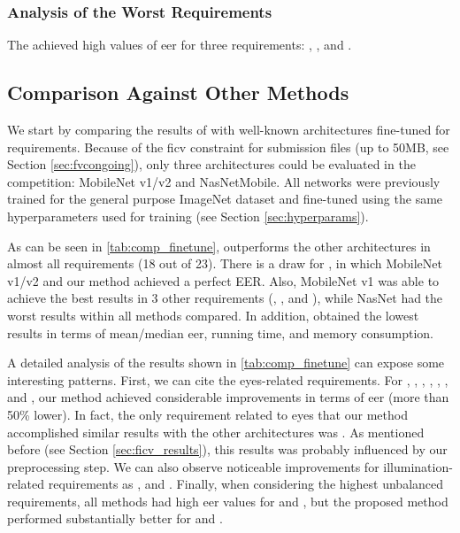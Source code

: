 

\subsubsection{Analysis of the Worst Requirements}

The \methodname achieved high values of \acs{eer} for three requirements: \inkmarked, \pixelation, and \otherfacesortoys. 


\subsection{Comparison Against Other Methods}

We start by comparing the results of \methodname with well-known architectures fine-tuned for \icao requirements. Because of the \acs{ficv} constraint for submission files (up to 50MB, see Section \ref{sec:fvcongoing}), only three architectures could be evaluated in the competition: MobileNet v1/v2 and NasNetMobile. All networks were previously trained for the general purpose ImageNet dataset \citep{imagenetdataset} and fine-tuned using the same hyperparameters used for \methodname training (see Section \ref{sec:hyperparams}).

As can be seen in \autoref{tab:comp_finetune}, \methodname outperforms the other architectures in almost all requirements (18 out of 23). There is a draw for \veiloverface, in which MobileNet v1/v2 and our method achieved a perfect EER. Also, MobileNet v1 was able to achieve the best results in 3 other requirements (\pixelation, \hatcap, and \otherfacesortoys), while NasNet had the worst results within all methods compared. In addition, \methodname obtained the lowest results in terms of mean/median \acs{eer}, running time, and memory consumption.

A detailed analysis of the results shown in \autoref{tab:comp_finetune} can expose some interesting patterns. First, we can cite the eyes-related requirements. For \lookingaway, \eyesclosed, \redeyes, \darktintedlenses, \flashlenses, \framestooheavy, and \framecoveringeyes, our method achieved considerable improvements in terms of \acs{eer} (more than 50\% lower). In fact, the only requirement related to eyes that our method accomplished similar results with the other architectures was \hairacrosseyes. As mentioned before (see Section \ref{sec:ficv_results}), this results was probably influenced by our preprocessing step. We can also observe noticeable improvements for illumination-related requirements as \toodarklight, \shadowsbehindhead and \shadowsacrossface. Finally, when considering the highest unbalanced requirements, all methods had high \acs{eer} values for \inkmarked and \otherfacesortoys, but the proposed method performed substantially better for \washedout and \framestooheavy.

